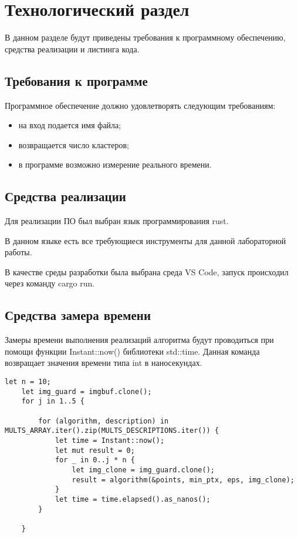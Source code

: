 \chapter{Технологический раздел}

В данном разделе будут приведены требования к программному обеспечению, средства реализации и листинга кода.

\section{Требования к программе}

Программное обеспечение должно удовлетворять следующим требованиям:
\begin{itemize}
	\item на вход подается имя файла;
	\item возвращается число кластеров;
	\item в программе возможно измерение реального времени.
\end{itemize}

\section{Средства реализации} 
Для реализации ПО был выбран язык программирования rust\cite{python}. 

В данном языке есть все требующиеся инструменты для данной лабораторной работы.

В качестве среды разработки была выбрана среда VS Code\cite{vscode}, запуск происходил через команду cargo run.

\section{Средства замера времени}

Замеры времени выполнения реализаций алгоритма будут проводиться при помощи функции Instant::now() \cite{test} библиотеки std::time. Данная команда возвращает значения  времени типа int в наносекундах.

\newpage

\begin{lstlisting}[label=bench,caption=Пример замера затраченного времени]
	let n = 10;
	let img_guard = imgbuf.clone();
	for j in 1..5 {

		for (algorithm, description) in MULTS_ARRAY.iter().zip(MULTS_DESCRIPTIONS.iter()) {
			let time = Instant::now();
			let mut result = 0;
			for _ in 0..j * n {
				let img_clone = img_guard.clone();
				result = algorithm(&points, min_ptx, eps, img_clone);
			}
			let time = time.elapsed().as_nanos();
		}
		
	}
\end{lstlisting}



